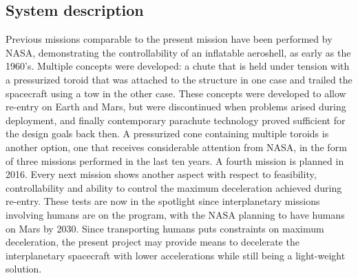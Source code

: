 \subsection{System description}
Previous missions comparable to the present mission have been performed by NASA, demonstrating the controllability of an inflatable aeroshell, as early as the 1960's. Multiple concepts were developed: a chute that is held under tension with a pressurized toroid that was attached to the structure in one case and trailed the spacecraft using a tow in the other case. These concepts were developed to allow re-entry on Earth and Mars, but were discontinued when problems arised during deployment, and finally contemporary parachute technology proved sufficient for the design goals back then.
A pressurized cone containing multiple toroids is another option, one that receives considerable attention from NASA, in the form of three missions performed in the last ten years. A fourth mission is planned in 2016. Every next mission shows another aspect with respect to feasibility, controllability and ability to control the maximum deceleration achieved during re-entry.
These tests are now in the spotlight since interplanetary missions involving humans are on the program, with the NASA planning to have humans on Mars by 2030. Since transporting humans puts constraints on maximum deceleration, the present project may provide means to decelerate the interplanetary spacecraft with lower accelerations while still being a light-weight solution.

